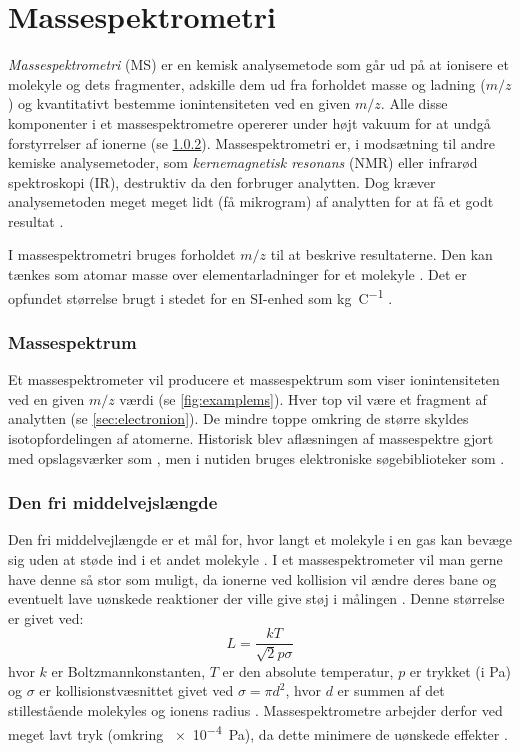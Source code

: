 \chapter{Massespektrometri}
\emph{Massespektrometri} (MS) er en kemisk analysemetode som går ud på at ionisere et molekyle og dets fragmenter, adskille dem ud fra forholdet masse og ladning ($m/z$) og kvantitativt bestemme ionintensiteten ved en given $m/z$.
Alle disse komponenter i et massespektrometre opererer under højt vakuum for at undgå forstyrrelser af ionerne (se \cref{subsec:freelength}).
Massespektrometri er, i modsætning til andre kemiske analysemetoder, som \emph{kernemagnetisk resonans} (NMR) eller infrarød spektroskopi (IR), destruktiv da den forbruger analytten.
Dog kræver analysemetoden meget meget lidt (få mikrogram) af analytten for at få et godt resultat \parencite{mstextbook}.
\par I massespektrometri bruges forholdet $m/z$ til at beskrive resultaterne.
Den kan tænkes som atomar masse over elementarladninger for et molekyle \parencite{chemana}.
Det er opfundet størrelse brugt i stedet for en SI-enhed som \unit[per-mode=power]{\kilogram\per\coulomb} \parencite{mstextbook}.
\subsection{Massespektrum}

Et massespektrometer vil producere et massespektrum som viser ionintensiteten ved en given $m/z$ værdi (se \cref{fig:examplems}).
Hver top vil være et fragment af analytten (se \cref{sec:electronion}).
De mindre toppe omkring de større skyldes isotopfordelingen af atomerne.
Historisk blev aflæsningen af massespektre gjort med opslagsværker som  \parencite{massspectra},
men i nutiden bruges elektroniske søgebiblioteker som  \parencite{nist23}.
\subsection{Den fri middelvejslængde}\label{subsec:freelength}
Den fri middelvejlængde er et mål for, hvor langt et molekyle i en gas kan bevæge sig uden at støde ind i et andet molekyle \parencite{knudsenstrømning}.
I et massespektrometer vil man gerne have denne så stor som muligt, da ionerne ved kollision vil ændre deres bane og eventuelt lave uønskede reaktioner der ville give støj i målingen \parencite{massspec}.
Denne størrelse er givet ved:
\begin{equation}
	L = \frac{kT}{\sqrt{2}p\sigma}
\end{equation}
hvor $k$ er Boltzmannkonstanten, $T$ er den absolute temperatur, $p$ er trykket (i \unit{\pascal}) og $\sigma$ er kollisionstvæsnittet givet ved $\sigma = \pi d^2$,
hvor $d$ er summen af det stillestående molekyles og ionens radius \parencite{massspec}.
Massespektrometre arbejder derfor ved meget lavt tryk (omkring \qty{e-4}{\pascal}), da dette minimere de uønskede effekter \parencite{mstextbook}.

